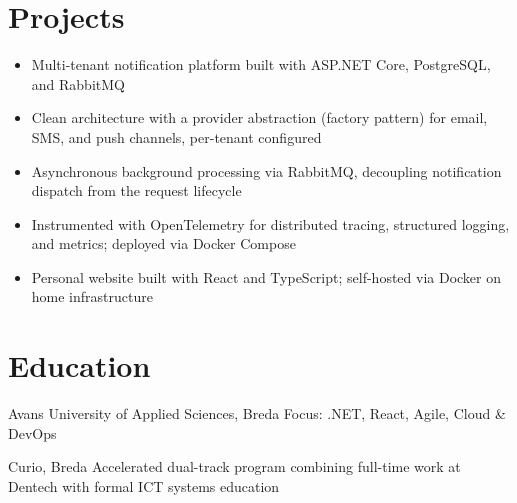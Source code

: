 \documentclass[a4paper,10pt]{article}
\begin{document}
\section{Projects}

\begin{itemize}
  \item Multi-tenant notification platform built with ASP.NET Core, PostgreSQL, and RabbitMQ
  \item Clean architecture with a provider abstraction (factory pattern) for email, SMS, and push channels, per-tenant configured
  \item Asynchronous background processing via RabbitMQ, decoupling notification dispatch from the request lifecycle
  \item Instrumented with OpenTelemetry for distributed tracing, structured logging, and metrics; deployed via Docker Compose
\end{itemize}

\vspace{1pt}

\begin{itemize}
  \item Personal website built with React and TypeScript; self-hosted via Docker on home infrastructure
\end{itemize}

\section{Education}

%
        {Avans University of Applied Sciences, Breda}{}
\vspace{-1pt}
{\small Focus: .NET, React, Agile, Cloud \& DevOps}

\vspace{1pt}

%
        {Curio, Breda}{}
\vspace{-1pt}
{\small Accelerated dual-track program combining full-time work at Dentech with formal ICT systems education}
\end{document}
